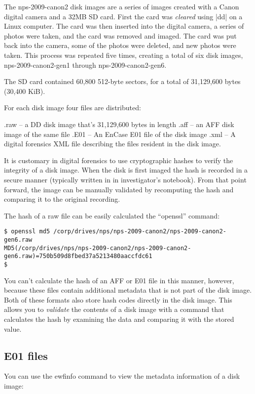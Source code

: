 \documentclass{book}
\begin{document}
The nps-2009-canon2 disk images are a series of images created with a
Canon digital camera and a 32MB SD card. First the card was
\emph{cleared} using |dd| on a Linux computer. The card was then
inserted into the digital camera, a series of photos were taken, and
the card was removed and imaged. The card was put back into the
camera, some of the photos were deleted, and new photos were
taken. This process was repeated five times, creating a total of six
disk images, nps-2009-canon2-gen1 through nps-2009-canon2-gen6.

The SD card contained 60,800 512-byte sectors, for a total of
31,129,600 bytes (30,400 KiB).

For each disk image four files are distributed:

   .raw -- a DD disk image that's 31,129,600 bytes in length
   .aff -- an AFF disk image of the same file
   .E01 -- An EnCase E01 file of the disk image
   .xml -- A digital forensics XML file describing the files resident
           in the disk image.


It is customary in digital forensics to use cryptographic hashes to
verify the integrity of a disk image. When the disk is first imaged
the hash is recorded in a secure manner (typically written in in
investigator's notebook). From that point forward, the image can be
manually validated by recomputing the hash and comparing it to the
original recording.

The hash of a raw file can be easily calculated the ``openssl''
command:

\begin{Verbatim}
$ openssl md5 /corp/drives/nps/nps-2009-canon2/nps-2009-canon2-gen6.raw
MD5(/corp/drives/nps/nps-2009-canon2/nps-2009-canon2-gen6.raw)=750b509d8fbed37a5213480aaccfdc61
$ 
\end{Verbatim}

You can't calculate the hash of an AFF or E01 file in this manner,
however, because these files contain additional metadata that is not
part of the disk image.  Both of these formats also store hash codes
directly in the disk image. This allows you to \emph{validate} the
contents of a disk image with a command that calculates the hash by
examining the data and comparing it with the stored value. 

\subsection{E01 files}
You can use the ewfinfo command to view the metadata information of a
disk image:
\end{document}

